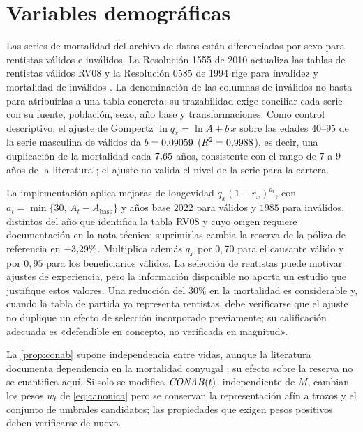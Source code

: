 \section{Variables demográficas}
\label{sec:var-demograficas}

Las series de mortalidad del archivo de datos están diferenciadas por sexo para
rentistas válidos e inválidos. La Resolución 1555 de 2010 actualiza las tablas de
rentistas válidos RV08 \citep{sfc2010} y la Resolución 0585 de 1994 rige para
invalidez y mortalidad de inválidos \citep{sfc1994}. La denominación de las
columnas de inválidos no basta para atribuirlas a una tabla concreta: su
trazabilidad exige conciliar cada serie con su fuente, población, sexo, año base y
transformaciones. Como control descriptivo, el ajuste de Gompertz
$\ln q_x=\ln A+b\,x$ sobre las edades $40$--$95$ de la serie masculina de
válidos da $b=0{,}09059$ ($R^2=0{,}9988$), es decir, una
duplicación de la mortalidad cada $7{,}65$ años, consistente con el
rango de $7$ a $9$ años de la literatura \citep{pitacco2009}; el ajuste no valida
el nivel de la serie para la cartera.

La implementación aplica mejoras de longevidad $q_x(1-r_x)^{a_t}$, con
$a_t=\min\{30,\,A_t-A_{\mathrm{base}}\}$ y años base $2022$ para válidos y
$1985$ para inválidos, distintos del año que identifica la tabla RV08 y cuyo
origen requiere documentación en la nota técnica;
suprimirlas cambia la reserva de la póliza de referencia en $-3{,}29\%$.
Multiplica además $q_x$ por $0{,}70$ para el causante válido y por $0{,}95$ para
los beneficiarios válidos. La selección de rentistas puede motivar ajustes de
experiencia, pero la información disponible no aporta un estudio que justifique
estos valores.
Una reducción del $30\%$ en la mortalidad es considerable y, cuando la tabla de
partida ya representa rentistas, debe verificarse que el ajuste no duplique un
efecto de selección incorporado previamente; su calificación adecuada es
«defendible en concepto, no verificada en magnitud».

\label{sec:var-dependencia}%
La \cref{prop:conab} supone independencia entre vidas, aunque la literatura
documenta dependencia en la mortalidad conyugal \citep{frees1996}; su efecto sobre
la reserva no se cuantifica aquí. Si solo se modifica $\mathit{CONAB}(t)$, independiente
de $M$, cambian los pesos $w_t$ de \cref{eq:canonica} pero se conservan la
representación afín a trozos y el conjunto de umbrales candidatos; las propiedades
que exigen pesos positivos deben verificarse de nuevo.

